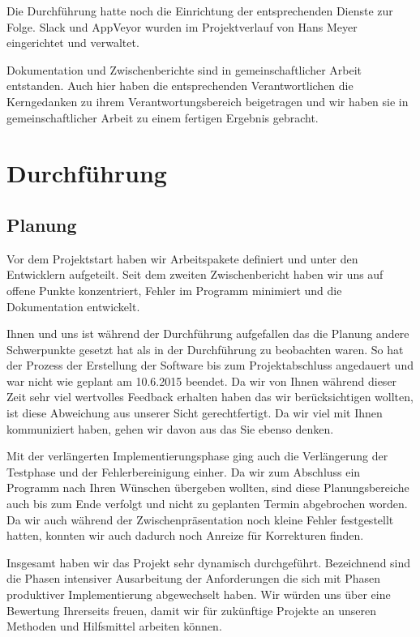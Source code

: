 \documentclass[12pt]{article}
\begin{document}
Die Durchführung hatte noch die Einrichtung der entsprechenden Dienste zur Folge. Slack und AppVeyor wurden im Projektverlauf von Hans Meyer eingerichtet und verwaltet. 
\newline

Dokumentation und Zwischenberichte sind in gemeinschaftlicher Arbeit entstanden. Auch hier haben die entsprechenden Verantwortlichen die Kerngedanken zu ihrem Verantwortungsbereich beigetragen und wir haben sie in gemeinschaftlicher Arbeit zu einem fertigen Ergebnis gebracht.
\newline

\newpage
\section{Durchführung}
\subsection{Planung}

Vor dem Projektstart haben wir Arbeitspakete definiert und unter den Entwicklern aufgeteilt. Seit dem zweiten Zwischenbericht haben wir uns auf offene Punkte konzentriert, Fehler im Programm minimiert und die Dokumentation entwickelt.
\newline 

Ihnen und uns ist während der Durchführung aufgefallen das die Planung andere Schwerpunkte gesetzt hat als in der Durchführung zu beobachten waren. So hat der Prozess der Erstellung der Software bis zum Projektabschluss angedauert und war nicht wie geplant am 10.6.2015 beendet. Da wir von Ihnen während dieser Zeit sehr viel wertvolles Feedback erhalten haben das wir berücksichtigen wollten, ist diese Abweichung aus unserer Sicht gerechtfertigt. Da wir viel mit Ihnen kommuniziert haben, gehen wir davon aus das Sie ebenso denken.
\newline

Mit der verlängerten Implementierungsphase ging auch die Verlängerung der Testphase und der Fehlerbereinigung einher. Da wir zum Abschluss ein Programm nach Ihren Wünschen übergeben wollten, sind diese Planungsbereiche auch bis zum Ende verfolgt und nicht zu geplanten Termin abgebrochen worden. Da wir auch während der Zwischenpräsentation noch kleine Fehler festgestellt hatten, konnten wir auch dadurch noch Anreize für Korrekturen finden.
\newline

Insgesamt haben wir das Projekt sehr dynamisch durchgeführt. Bezeichnend sind die Phasen intensiver Ausarbeitung der Anforderungen die sich mit Phasen produktiver Implementierung abgewechselt haben. Wir würden uns über eine Bewertung Ihrerseits freuen, damit wir für zukünftige Projekte an unseren Methoden und Hilfsmittel arbeiten können.
\end{document}
